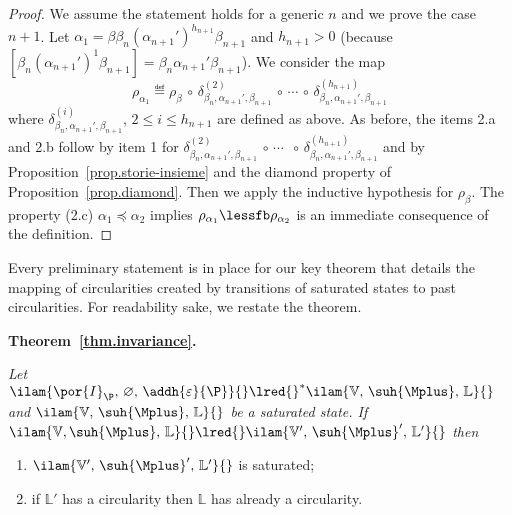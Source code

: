 \begin{proof}
We assume the statement holds for a generic $n$ and we prove the case $n+1$.
Let $\alpha_1 = \beta 
\beta_{n}(\alpha_{n+1}')^{h_{n+1}}\beta_{n+1}$ and $h_{n+1} >0$ (because
$[\beta_{n}(\alpha_{n+1}')^1\beta_{n+1}] = \beta_{n}\alpha_{n+1}'\beta_{n+1}$). We consider the map
\[
\rho_{\alpha_1} \eqdef \rho_{\beta} {\scriptstyle \, \circ \,} \delta_{\beta_n,\alpha_{n+1}',\beta_{n+1}}^{(2)} {\scriptstyle \, \circ \,}
\cdots {\scriptstyle \, \circ \,} \delta_{\beta_n,\alpha_{n+1}',\beta_{n+1}}^{(h_{n+1})}\]
where $\delta_{\beta_n,\alpha_{n+1}',\beta_{n+1}}^{(i)}$, $2 \leq i \leq h_{n+1}$
are defined as above.
As before, the items 2.a and 2.b follow by item 1 for 
$\delta_{\beta_n,\alpha_{n+1}',\beta_{n+1}}^{(2)} {\scriptstyle \, \circ \,}
\cdots$ ${\scriptstyle \, \circ \,} \delta_{\beta_n,\alpha_{n+1}',\beta_{n+1}}^{(h_{n+1})}$ and by
Proposition~\ref{prop.storie-insieme} and the diamond property of Proposition~\ref{prop.diamond}.  Then we apply the inductive hypothesis for $\rho_{\beta}$.
The property (2.c) $\alpha_1 \preceq \alpha_2$ implies
 $\rho_{\alpha_1} \lessfb \rho_{\alpha_2}$ is an immediate consequence of the definition.
\end{proof}


Every preliminary statement is in place for our key theorem that details the mapping
of circularities created by transitions of saturated states to past circularities.
For readability sake, we restate the theorem.

\bigskip

\noindent
{\bf Theorem~\ref{thm.invariance}.} {\em
Let $\ilam{\por{I}_{\P}, \, \varnothing, \,  \addh{\varepsilon}{\P}}{} \lred{}^* \ilam{\mathbb{V}, \, \suh{\Mplus}, \, \mathbb{L}}{}$ 
and
$\ilam{\mathbb{V}, \,  \suh{\Mplus}, \,\mathbb{L}}{}$ be a saturated state.
If
$\ilam{\mathbb{V},  \suh{\Mplus}, \,\mathbb{L}}{} \lred{}
\ilam{\mathbb{V}', \,  \suh{\Mplus}', \,\mathbb{L}'}{}$ then
\begin{enumerate}
\item
$\ilam{\mathbb{V}', \,  \suh{\Mplus}', \,\mathbb{L}'}{}$ is saturated;
\item
if $\mathbb{L}'$ has a circularity then $\mathbb{L}$ has already 
a circularity.
\end{enumerate}
}


